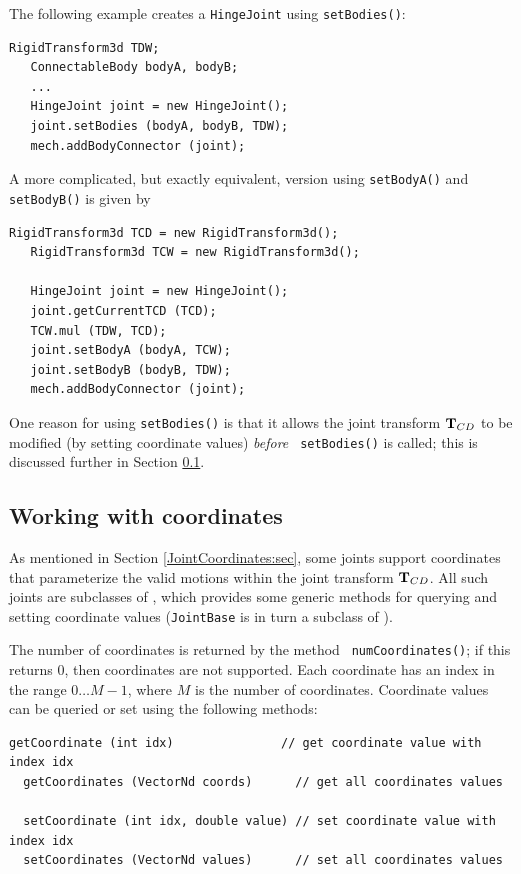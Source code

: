 The following example creates a {\tt HingeJoint} using {\tt setBodies()}:
%
\begin{lstlisting}[]
   RigidTransform3d TDW;
   ConnectableBody bodyA, bodyB;
   ...
   HingeJoint joint = new HingeJoint();
   joint.setBodies (bodyA, bodyB, TDW);
   mech.addBodyConnector (joint);
\end{lstlisting}
%
A more complicated, but exactly equivalent, version using {\tt setBodyA()} and
{\tt setBodyB()} is given by
%
\begin{lstlisting}[]
   RigidTransform3d TCD = new RigidTransform3d();
   RigidTransform3d TCW = new RigidTransform3d();

   HingeJoint joint = new HingeJoint();
   joint.getCurrentTCD (TCD);
   TCW.mul (TDW, TCD);
   joint.setBodyA (bodyA, TCW);
   joint.setBodyB (bodyB, TDW);
   mech.addBodyConnector (joint);
\end{lstlisting}
%
One reason for using {\tt setBodies()} is that it allows the joint transform
${\bf T}_{CD}$ to be modified (by setting coordinate values) {\it before} {\tt
setBodies()} is called; this is discussed further in
Section \ref{workingWithCoordinates:sec}.

\subsection{Working with coordinates}
\label{workingWithCoordinates:sec}

As mentioned in Section \ref{JointCoordinates:sec}, some joints
support coordinates that parameterize the valid motions within the
joint transform ${\bf T}_{CD}$. All such joints are subclasses of
,
which provides some generic methods for querying and setting
coordinate values ({\tt JointBase} is in turn a subclass of
).

The number of coordinates is returned by the method {\tt
numCoordinates()}; if this returns 0, then coordinates are not
supported. Each coordinate has an index in the range $0 \ldots M-1$,
where $M$ is the number of coordinates. Coordinate values can be
queried or set using the following methods:
\begin{lstlisting}[]
  getCoordinate (int idx)               // get coordinate value with index idx
  getCoordinates (VectorNd coords)      // get all coordinates values

  setCoordinate (int idx, double value) // set coordinate value with index idx
  setCoordinates (VectorNd values)      // set all coordinates values
\end{lstlisting}
%

